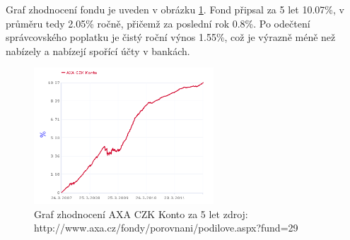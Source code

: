 \documentclass[a4paper,12pt]{article}
\begin{document}
			Graf zhodnocení fondu je uveden v obrázku \ref{axa_czk_konto}. Fond připsal za 5 let 10.07\%, v průměru tedy 2.05\% ročně, přičemž za poslední rok 0.8\%. Po odečtení správcovského poplatku je čistý roční výnos 1.55\%, což je výrazně méně než nabízely a nabízejí spořící účty v bankách.
			\begin{figure}[h!]
				\label{axa_czk_konto}

		  	\centering
				\includegraphics[width=0.6\textwidth]{axa_czk_konto.png}			
				\caption{Graf zhodnocení AXA CZK Konto za 5 let zdroj: http://www.axa.cz/fondy/porovnani/podilove.aspx?fund=29}
			\end{figure}

\newpage	
\appendix
\end{document}
